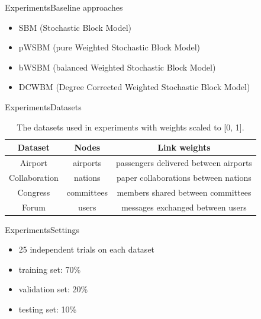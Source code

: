 \documentclass{beamer}
\begin{document}
\begin{frame}{Experiments}{Baseline approaches}
	\begin{itemize}
		\item SBM (Stochastic Block Model)
		\item pWSBM (pure Weighted Stochastic Block Model)
		\item bWSBM (balanced Weighted Stochastic Block Model)
		\item DCWBM (Degree Corrected Weighted Stochastic Block Model)
	\end{itemize}
\end{frame}

\begin{frame}{Experiments}{Datasets}
	\begin{table}[H]\centering
		\caption{The datasets used in experiments with weights scaled to [0, 1].}
		\begin{tabular}{ccc}  \hline
			Dataset & Nodes & Link weights \\ \hline
			Airport & airports & passengers delivered between airports \\ \hline
			Collaboration & nations & paper collaborations between nations \\ \hline
			Congress & committees  & members shared between committees \\ \hline
			Forum  & users & messages exchanged between users \\ \hline
		\end{tabular}
		\label{tab:datasets}
	\end{table}
\end{frame}

\begin{frame}{Experiments}{Settings}
	\begin{itemize}
		\item 25 independent trials on each dataset
		\item training set: 70\%
		\item validation set: 20\%
		\item testing set: 10\%
	\end{itemize}
\end{frame}
\end{document}
